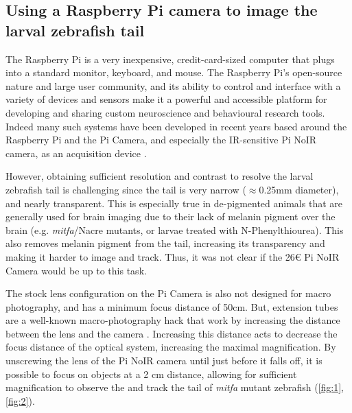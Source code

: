\documentclass[9pt,lineno]{RandlettLab_elife}
\begin{document}
\subsection{Using a Raspberry Pi camera to image the larval zebrafish tail}

The Raspberry Pi is a very inexpensive, credit-card-sized computer that plugs into a standard monitor, keyboard, and mouse. The Raspberry Pi's open-source nature and large user community, and its ability to control and interface with a variety of devices and sensors make it a powerful and accessible platform for developing and sharing custom neuroscience and behavioural research tools. Indeed many such systems have been developed in recent years based around the Raspberry Pi and the Pi Camera, and especially the IR-sensitive Pi NoIR camera, as an acquisition device \citep{Geissmann2017-gd, Maia_Chagas2017-mf, Saunders2019-ka, Tadres2020-as, Broussard2022-yd}. 

However, obtaining sufficient resolution and contrast to resolve the larval zebrafish tail is challenging since the tail is very narrow ($\approx$0.25mm diameter), and nearly transparent. This is especially true in de-pigmented animals that are generally used for brain imaging due to their lack of melanin pigment over the brain (e.g. \textit{mitfa}/Nacre mutants, or larvae treated with N-Phenylthiourea). This also removes melanin pigment from the tail, increasing its transparency and making it harder to image and track. Thus, it was not clear if the 26€ Pi NoIR Camera would be up to this task. 

The stock lens configuration on the Pi Camera is also not designed for macro photography, and has a minimum focus distance of 50cm. But, extension tubes are a well-known macro-photography hack that work by increasing the distance between the lens and the camera \citep{enwiki:1118116052}. Increasing this distance acts to decrease the focus distance of the optical system, increasing the maximal magnification. By unscrewing the lens of the Pi NoIR camera until just before it falls off, it is possible to focus on objects at a 2 cm distance, allowing for sufficient magnification to observe the and track the tail of \textit{mitfa} mutant zebrafish (\autoref{fig:1}, \autoref{fig:2}).
\end{document}
